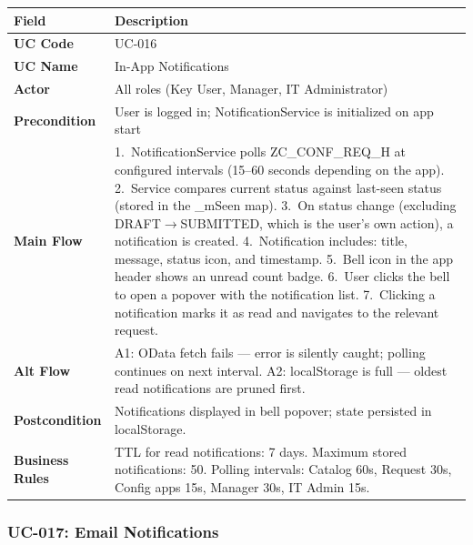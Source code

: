 \documentclass[12pt,a4paper]{report}
\begin{document}
\begin{longtable}{|>{\bfseries}p{2.8cm}|p{12cm}|}
  \hline
  \rowcolor{tableheadpeach}
  \textbf{Field} & \textbf{Description} \\ \hline
  \endhead \hline \endfoot
  UC Code       & UC-016 \\ \hline
  UC Name       & In-App Notifications \\ \hline
  Actor         & All roles (Key User, Manager, IT Administrator) \\ \hline
  Precondition  & User is logged in; NotificationService is initialized on app start \\ \hline
  Main Flow     & 1.~NotificationService polls ZC\_CONF\_REQ\_H at configured intervals (15--60 seconds depending on the app).
                  2.~Service compares current status against last-seen status (stored in the \_mSeen map).
                  3.~On status change (excluding DRAFT$\rightarrow$SUBMITTED, which is the user's own action), a notification is created.
                  4.~Notification includes: title, message, status icon, and timestamp.
                  5.~Bell icon in the app header shows an unread count badge.
                  6.~User clicks the bell to open a popover with the notification list.
                  7.~Clicking a notification marks it as read and navigates to the relevant request. \\ \hline
  Alt Flow      & A1: OData fetch fails --- error is silently caught; polling continues on next interval.
                  A2: localStorage is full --- oldest read notifications are pruned first. \\ \hline
  Postcondition & Notifications displayed in bell popover; state persisted in localStorage. \\ \hline
  Business Rules& TTL for read notifications: 7 days. Maximum stored notifications: 50. Polling intervals: Catalog 60s, Request 30s, Config apps 15s, Manager 30s, IT Admin 15s. \\ \hline
\end{longtable}

\subsubsection{UC-017: Email Notifications}
\end{document}
